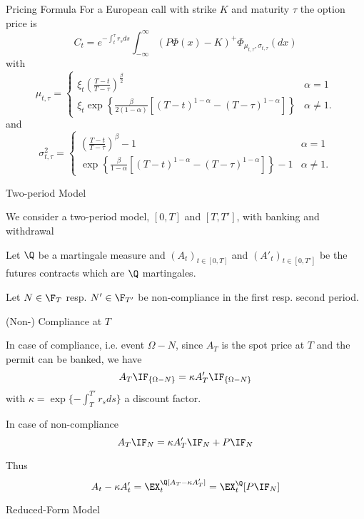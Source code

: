 {Pricing Formula}
For a European call with strike $K$ and maturity $\tau$ the option price is
$$
C_t = e^{-\int_t^\tau r_s ds} \int_{-\infty}^\infty (P\Phi(x)-K)^+ \Phi_{\mu_{t,\tau}, \sigma_{t,\tau}}(dx)
$$
with
$$
\mu_{t,\tau}=
\left\{
\begin{array}{ll}
\xi_t \left(\frac{T-t}{T-\tau}\right)^{\frac{\beta}{2}} & \alpha =1\\
\xi_t \exp\left\{\frac{\beta}{2(1-\alpha)}[(T-t)^{1-\alpha}-(T-\tau)^{1-\alpha}]\right\} & \alpha \not= 1.
\end{array}
\right.
$$
and
$$
\sigma^2_{t,\tau}=
\left\{
\begin{array}{ll}
\left(\frac{T-t}{T-\tau}\right)^\beta-1 & \alpha =1\\
\exp\left\{\frac{\beta}{1-\alpha}[(T-t)^{1-\alpha}-(T-\tau)^{1-\alpha}]\right\}-1 & \alpha \not= 1.
\end{array}
\right.
$$


{Two-period Model}


	We consider a two-period model, $[0,T]$ and $[T,T']$, with banking and withdrawal

	Let $\Q$ be a martingale measure and $(A_t)_{t\in[0,T]}$ and $(A'_t)_{t\in[0,T']}$
be the futures contracts which are $\Q$ martingales.

	Let $N\in \F_T$ resp. $N' \in \F_{T'}$ be non-compliance in the first resp. second period.


{(Non-) Compliance at $T$}


	In case of compliance, i.e. event $\Omega-N$, since $A_T$ is the spot price at $T$ and the permit can be banked,  we have
$$
A_T\IF_{\{\Omega-N\}}= \kappa A'_T \IF_{\{\Omega-N\}}
$$
with $\kappa= \exp\{-\int_T^{T'}r_s ds\}$ a discount factor.

	In case of non-compliance
$$
A_T\IF_{N}= \kappa A'_T \IF_{N} + P\IF_N
$$

	Thus
$$
A_t-\kappa A'_t = \EX_t^\Q[A_T-\kappa A'_T]= \EX^\Q_t[P \IF_N]
$$


{Reduced-Form Model}

